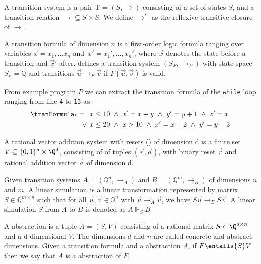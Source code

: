 \begin{mydef}
A transition system is a pair T = $(S, \rightarrow)$ consisting of a set of states $S$, and a transition relation $\rightarrow \subseteq S \times S$. We define $\rightarrow^*$ as the reflexive transitive closure of $\rightarrow$.
\end{mydef}

\begin{mydef}
A transition formula \tranFormula of dimension $n$ is a first-order logic formula ranging over variables $\vec{x} = x_1, \ldots x_n$ and $\vec{x}' = x_1', \ldots, x_n'$, where $\vec{x}$ denotes the state before a transition and $\vec{x}'$ after. \tranFormula defines a transition system $(S_F, \rightarrow_F)$ with state space $S_F = \mathbb{Q}$ and transitions $\vec{u} \rightarrow_F \vec{v}$ if $F(\vec{u}, \vec{v})$ is valid.
\end{mydef}
\begin{example}
    From example program $P$ we can extract the transition formula of the \texttt{while} loop ranging from line \texttt{4} to \texttt{13} as:
    \begin{align*}
    \tranFormula_\ell =\ \  &x \leq 10 \ \land\ x' = x + y\ \land\ y' = y+1\ \land\ z' = x\ \\ \lor\ & x \leq 20\ \land\ x > 10\ \land\ x' = x + 2\ \land\ y' = y - 3
    \end{align*}
\end{example}

\begin{mydef}
A rational vector addition system with resets (\qvasr) of dimension d is a finite set $V \subseteq \{0, 1\}^d \times \Q^d$, consisting of of tuples $(\vec{r}, \vec{a})$, with binary reset $\vec{r}$ and rational addition vector $\vec{a}$ of dimension d.
\end{mydef}

\begin{mydef}
Given transition systems $A = (\mathbb{Q}^n, \rightarrow_A)$ and $B = (\mathbb{Q}^m, \rightarrow_B)$ of dimensions $n$ and $m$. A linear simulation is a linear transformation represented by matrix $S \in \mathbb{Q}^{m \times n}$ such that for all $\vec{u}, \vec{v} \in \mathbb{Q}^n$ with $\vec{u} \rightarrow_A \vec{v}$, we have $S\vec{u} \rightarrow_B S\vec{v}$. A linear simulation $S$ from $A$ to $B$ is denoted as $A \Vdash_{S} B$
\end{mydef}

\begin{mydef}
A \qvasr abstraction is a tuple $A = (S, V)$ consisting of a rational matrix $S \in \Q^{d \times n}$ and a d-dimensional \qvasr $V$. The dimensions $d$ and $n$ are called concrete and abstract dimensions.
Given a transition formula \tranFormula and a \qvasr abstraction $A$, if $F \entails{S} V$ then we say that $A$ is a \qvasr abstraction of $F$.
\end{mydef}

